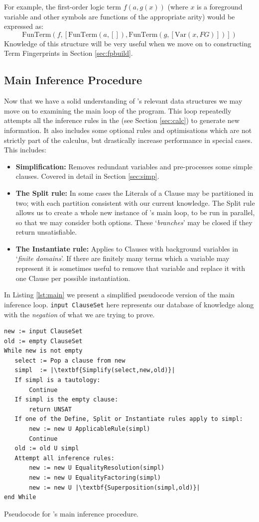 For example, the first-order logic term $f(a, g(x))$ (where $x$ is a foreground
variable and other symbols are functions of the appropriate arity) would be expressed as:
\[\text{FunTerm}(f, [\text{FunTerm}(a, []), \text{FunTerm}(g, [\text{Var}(x, FG)])] )\]
Knowledge of this structure will be very useful when we move on to constructing
Term Fingerprints in Section \ref{sec:fpbuild}.

\subsection{Main Inference Procedure}
\label{sec:mloop}

Now that we have a solid understanding of \beagle's relevant data structures
we may move on to examining the main loop of the program. This loop repeatedly
attempts all the inference rules in the {\HSWAC} (see Section \ref{sec:calc})
to generate new information. It also includes some optional rules and optimisations
which are not strictly part of the calculus, but drastically increase performance
in special cases. This includes:
\begin{itemize}
\item \textbf{Simplification:} Removes redundant variables and pre-processes some simple clauses.
Covered in detail in Section \ref{sec:simp}.
\item \textbf{The Split rule:} In some cases the Literals of a Clause may be partitioned
in two; with each partition consistent with our current knowledge. The Split rule allows
us to create a whole new instance of \beagle's main loop, to be run in parallel,
so that we may consider both options. These `\emph{branches}' may be closed if they return
unsatisfiable.
\item \textbf{The Instantiate rule:} Applies to Clauses with background variables in `\emph{finite domains}'.
If there are finitely many terms which a variable may represent it is sometimes useful
to remove that variable and replace it with one Clause per possible instantiation.
\end{itemize}

In Listing \ref{lst:main} we present a simplified pseudocode version of the main inference loop.
\verb!input ClauseSet! here represents our database of knowledge along with
the \emph{negation} of what we are trying to prove.
\begin{listing}[H]
\begin{lstlisting}
new := input ClauseSet
old := empty ClauseSet
While new is not empty
   select := Pop a clause from new
   simpl  := |\textbf{Simplify(select,new,old)}|
   If simpl is a tautology:
       Continue
   If simpl is the empty clause:
       return UNSAT
   If one of the Define, Split or Instantiate rules apply to simpl:
       new := new U ApplicableRule(simpl)
       Continue
   old := old U simpl
   Attempt all inference rules:
       new := new U EqualityResolution(simpl)
       new := new U EqualityFactoring(simpl)
       new := new U |\textbf{Superposition(simpl,old)}|
end While
\end{lstlisting}
\caption{Pseudocode for \beagle's main inference procedure.}
\label{lst:main}
\end{listing}

